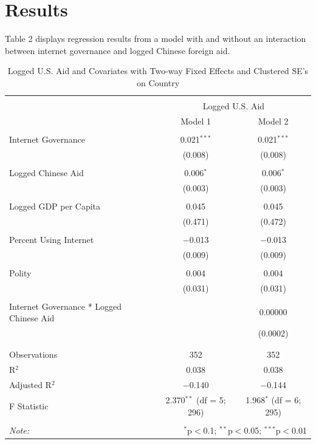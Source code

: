 \documentclass[12pt]{article}
\begin{document}
\section*{Results}
Table 2 displays regression results from a model with and without an interaction between internet governance and logged Chinese foreign aid.
\begin{table}[!htbp] \centering 
  \caption{Logged U.S. Aid and Covariates with Two-way Fixed Effects and Clustered SE's on Country} 
  \label{} 
\begin{tabular}{@{\extracolsep{5pt}}lcc} 
\\[-1.8ex]\hline 
\hline \\[-1.8ex] 
 & \multicolumn{2}{c}{Logged U.S. Aid} \\ 
\cline{2-3} 
 & Model 1 & Model 2 \\ 
\hline \\[-1.8ex] 
 Internet Governance & 0.021$^{***}$ & 0.021$^{***}$ \\ 
  & (0.008) & (0.008) \\ 
  & & \\ 
 Logged Chinese Aid & 0.006$^{*}$ & 0.006$^{*}$ \\ 
  & (0.003) & (0.003) \\ 
  & & \\ 
 Logged GDP per Capita & 0.045 & 0.045 \\ 
  & (0.471) & (0.472) \\ 
  & & \\ 
 Percent Using Internet & $-$0.013 & $-$0.013 \\ 
  & (0.009) & (0.009) \\ 
  & & \\ 
 Polity & 0.004 & 0.004 \\ 
  & (0.031) & (0.031) \\ 
  & & \\ 
 Internet Governance * Logged Chinese Aid &  & 0.00000 \\ 
  &  & (0.0002) \\ 
  & & \\ 
\hline \\[-1.8ex] 
Observations & 352 & 352 \\ 
R$^{2}$ & 0.038 & 0.038 \\ 
Adjusted R$^{2}$ & $-$0.140 & $-$0.144 \\ 
F Statistic & 2.370$^{**}$ (df = 5; 296) & 1.968$^{*}$ (df = 6; 295) \\ 
\hline 
\hline \\[-1.8ex] 
\textit{Note:}  & \multicolumn{2}{r}{$^{*}$p$<$0.1; $^{**}$p$<$0.05; $^{***}$p$<$0.01} \\ 
\end{tabular} 
\end{table}
\pagebreak
\end{document}
